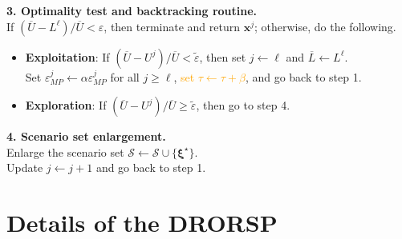 \documentclass[preprint,review,11pt]{elsarticle}
\theoremstyle{definition}
\theoremstyle{remark}
\newcommand{\tp}{\top}
\newcommand{\epst}{\widetilde{\varepsilon}}
\newcommand{\calS}{\mathcal{S}}
\newcommand{\xb}{\pmb{x}}
\newcommand{\yb}{\pmb{y}}
\newcommand{\hb}{\pmb{h}}
\newcommand{\qb}{\pmb{q}}
\newcommand{\xib}{\pmb{\xi}}
\newcommand{\Cb}{\pmb{C}}
\newcommand{\Tb}{\pmb{T}}
\newcommand{\Wb}{\pmb{W}}
\newcommand{\Lbar}{\overline{L}}
\newcommand{\Ubar}{\overline{U}}
\begin{document}
\begin{algorithm}[t!]
\textbf{3. Optimality test and backtracking routine.} \\
\hspace{5.3mm}If $(\Ubar-L^\ell)/\Ubar<\varepsilon$, then terminate and return $\xb^j$; otherwise, do the following.
%
\begin{itemize}
    \item \textbf{Exploitation}: If $(\Ubar-U^j)/\Ubar < \epst$, then set $j\leftarrow \ell$ and $\Lbar\leftarrow L^\ell$. \\ Set $\varepsilon^j_{MP}\leftarrow \alpha \varepsilon^j_{MP}$ for all $j\geq \ell$, \textcolor{orange}{set $\tau\leftarrow \tau+\beta$}, and go back to step 1. \vspace{-3mm}
    \item \textbf{Exploration}: If $(\Ubar-U^j)/\Ubar  \geq \epst$, then go to step 4.  \vspace{-3mm}
\end{itemize}
%
\textbf{4. Scenario set enlargement.}\\
\hspace{5.3mm}Enlarge the scenario set $\calS \leftarrow \calS\cup\{\xib^\star\}$. \\ \hspace{5.3mm}Update $j \leftarrow j+1$ and go back to step 1.
\BlankLine
\caption{Inexact column-and-constraint (i-C\&CG) method, time limit variant} \label{algo:inexact_C&CG_V2}
\end{algorithm}\DecMargin{1em}





\section{Details of the DRORSP} \label{appdx:DRORSP}


\end{document}
